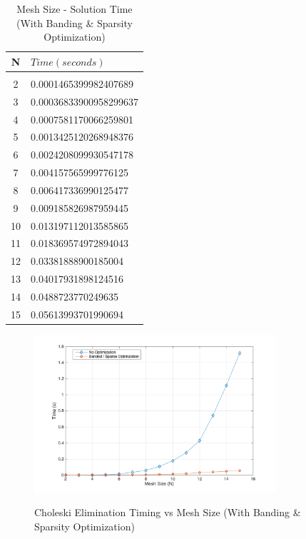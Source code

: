 \documentclass[11pt]{amsart}
\begin{document}
\begin{table}[h!]
    \caption{Mesh Size - Solution Time (With Banding \& Sparsity Optimization)}
    \label{tbl:time_v_mesh_opt}
    \begin{tabular}{ c| l}
    	\textbf{N} & \textbf{$Time (seconds)$}\\ \hline \\
	2 & 0.0001465399982407689\\
	3 & 0.00036833900958299637\\
	4 & 0.0007581170066259801\\
	5 & 0.0013425120268948376\\
	6 & 0.0024208099930547178\\
	7 & 0.004157565999776125\\
	8 & 0.006417336990125477\\
	9 & 0.009185826987959445\\
	10 & 0.013197112013585865\\
	11 & 0.018369574972894043\\
	12 & 0.03381888900185004\\
	13 & 0.04017931898124516\\
	14 & 0.0488723770249635\\
	15 & 0.05613993701990694
    \end{tabular}
\end{table}
\vspace{3em}
\begin{center}
	\begin{figure}[h]
		\caption{Choleski Elimination Timing vs Mesh Size (With Banding \& Sparsity Optimization)}
		\includegraphics[width=0.8\textwidth]{assets/t_vs_n_opt.png}\label{fig:t_n_opt}
	\end{figure}
\end{center}
\vspace{3em}
\end{document}
